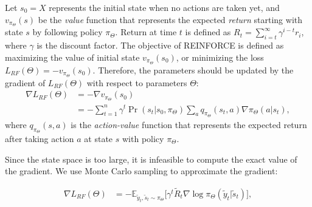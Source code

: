 \documentclass[letterpaper]{article} %
\begin{document}
	Let $s_0=X$ represents the initial state when no actions are taken yet, and $v_{\pi_{\Theta}}(s)$ be the \emph{value} function that represents the expected \emph{return} starting with state $s$ by following policy $\pi_{\Theta}$. Return at time $t$ is defined as $R_t=\sum_{i=t}^{\infty} \gamma^{i-t} r_i$, where $\gamma$ is the discount factor. The objective of REINFORCE is defined as maximizing the value of initial state $v_{\pi_{\Theta}}(s_0)$, or minimizing the loss $L_{RF}(\Theta) = - v_{\pi_{\Theta}}(s_0)$. Therefore, the parameters should be updated by the gradient of $L_{RF}(\Theta)$ with respect to parameters $\Theta$:
	\begin{align}
	\nabla L_{RF}(\Theta) &= - \nabla v_{\pi_{\Theta}}(s_0) \label{eq:L_RF} \\ 
	&=- \sum_{t=1}^{n} \gamma^t \Pr(s_t | s_0, \pi_{\Theta}) \sum_{a} q_{\pi_{\Theta}}(s_t,a) \nabla \pi_{\Theta}(a|s_t) ,
	\end{align} 
	where $q_{\pi_{\Theta}}(s,a)$ is the \emph{action-value} function that represents the expected return after taking action $a$ at state $s$ with policy $\pi_{\Theta}$. 
	
	Since the state space is too large, it is infeasible to compute the exact value of the gradient. We use Monte Carlo sampling to approximate the gradient:

    \begin{align}
	\nabla L_{RF}(\Theta) &= - \mathbb{E}_{\tilde{y}_t, \tilde{s}_t \sim \pi_{\Theta}} \Big[ \gamma^t \tilde{R}_t \nabla \log \pi_{\Theta}(\tilde{y}_t|\tilde{s}_t) \Big] ,
	\end{align}
\end{document}
